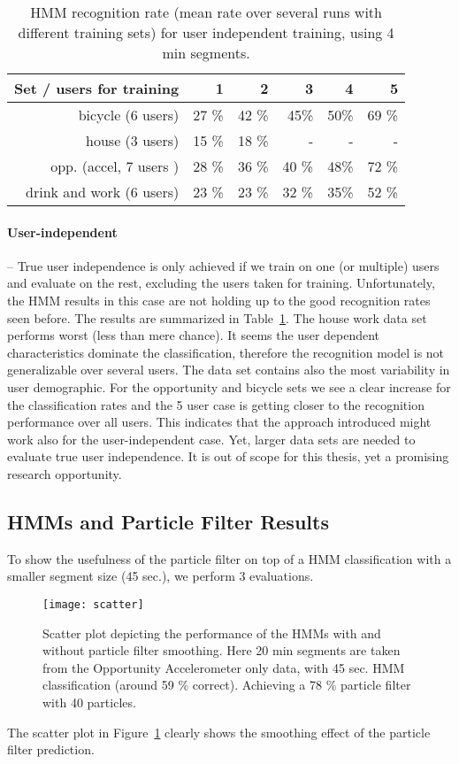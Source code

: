 \begin{table}[!t]
\centering
\caption[HMM recognition rate]{HMM recognition rate (mean rate over several runs with different training sets) for user independent training, using 4 min segments.}
\begin{tabular}{r r r r r r}\toprule
Set / users for training & 1 & 2 & 3 & 4 & 5\\
\midrule
bicycle (6 users) & 27 \% & 42 \% & 45\%  & 50\% & 69 \%\\
house (3 users)  & 15 \% & 18 \% & - & - & -\\
opp. (accel, 7 users ) & 28 \% &36 \% & 40 \% & 48\% & 72 \%\\
drink and work (6 users) & 23 \% & 23 \% & 32 \% & 35\% & 52 \%\\
\bottomrule
\end{tabular}
\label{overview_ui}
\end{table}

\paragraph{User-independent} -- True user independence is only achieved
if we train on one (or multiple) users and evaluate on the rest, excluding
the users taken for training. Unfortunately, the HMM results in this 
case are not holding up to the good recognition rates seen before.
The results are summarized in Table~\ref{overview_ui}. 
The house work data set performs worst (less than mere chance).
It seems the user dependent characteristics dominate the classification,
therefore the recognition model is not generalizable over several users.
The data set contains also the most variability in user demographic.
For the opportunity and bicycle sets we see a clear increase for
the classification rates and the 5 user case is getting closer to 
the recognition performance over all users. 
This indicates that the approach introduced might work also
for the user-independent case. Yet, larger data sets are needed to
evaluate true user independence. It is out of scope for this thesis,
yet a promising research opportunity.

\subsection{HMMs and Particle Filter Results}

To show the usefulness of the particle filter on top of a HMM classification with a
smaller segment size (45 sec.), we perform 3 evaluations.
\begin{figure}[!t]
\centering
\texttt{[image: scatter]}
\caption[HMM Scatter Plot]{Scatter plot depicting the performance of the HMMs with and without particle filter smoothing. Here 20 min segments are taken
from the Opportunity Accelerometer only data, with 45 sec. HMM classification (around 59 \% correct). Achieving a 78 \% particle filter with 40 particles. }
\label{fig_scatter}
\end{figure}
The scatter plot in Figure~\ref{fig_scatter} clearly shows the smoothing effect
of the particle filter prediction.

